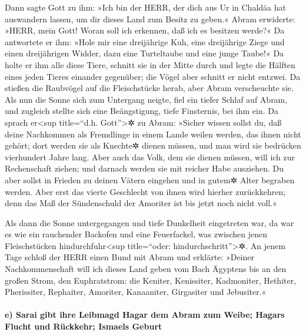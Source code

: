  Dann sagte Gott zu ihm: »Ich bin der HERR, der dich aus
Ur in Chaldäa hat auswandern lassen, um dir dieses Land zum Besitz zu
geben.«  Abram erwiderte: »HERR, mein Gott! Woran soll ich
erkennen, daß ich es besitzen werde?«  Da antwortete er
ihm: »Hole mir eine dreijährige Kuh, eine dreijährige Ziege und einen
dreijährigen Widder, dazu eine Turteltaube und eine junge Taube!«
 Da holte er ihm alle diese Tiere, schnitt sie in der
Mitte durch und legte die Hälften eines jeden Tieres einander gegenüber;
die Vögel aber schnitt er nicht entzwei.  Da stießen die
Raubvögel auf die Fleischstücke herab, aber Abram verscheuchte sie.
 Als nun die Sonne sich zum Untergang neigte, fiel ein
tiefer Schlaf auf Abram, und zugleich stellte sich eine Beängstigung,
tiefe Finsternis, bei ihm ein.  Da sprach er\textless sup
title=``d.h. Gott''\textgreater✲ zu Abram: »Sicher wissen sollst du, daß
deine Nachkommen als Fremdlinge in einem Lande weilen werden, das ihnen
nicht gehört; dort werden sie als Knechte✲ dienen müssen, und man wird
sie bedrücken vierhundert Jahre lang.  Aber auch das
Volk, dem sie dienen müssen, will ich zur Rechenschaft ziehen; und
darnach werden sie mit reicher Habe ausziehen.  Du aber
sollst in Frieden zu deinen Vätern eingehen und in gutem✲ Alter begraben
werden.  Aber erst das vierte Geschlecht von ihnen wird
hierher zurückkehren; denn das Maß der Sündenschuld der Amoriter ist bis
jetzt noch nicht voll.«

 Als dann die Sonne untergegangen und tiefe Dunkelheit
eingetreten war, da war es wie ein rauchender Backofen und eine
Feuerfackel, was zwischen jenen Fleischstücken hindurchfuhr\textless sup
title=``oder: hindurchschritt''\textgreater✲.  An jenem
Tage schloß der HERR einen Bund mit Abram und erklärte: »Deiner
Nachkommenschaft will ich dieses Land geben vom Bach Ägyptens bis an den
großen Strom, den Euphratstrom:  die Keniter, Kenissiter,
Kadmoniter,  Hethiter, Pherissiter, Rephaiter,
 Amoriter, Kanaaniter, Girgasiter und Jebusiter.«

\hypertarget{e-sarai-gibt-ihre-leibmagd-hagar-dem-abram-zum-weibe-hagars-flucht-und-ruxfcckkehr-ismaels-geburt}{%
\paragraph{e) Sarai gibt ihre Leibmagd Hagar dem Abram zum Weibe; Hagars
Flucht und Rückkehr; Ismaels
Geburt}\label{e-sarai-gibt-ihre-leibmagd-hagar-dem-abram-zum-weibe-hagars-flucht-und-ruxfcckkehr-ismaels-geburt}}

